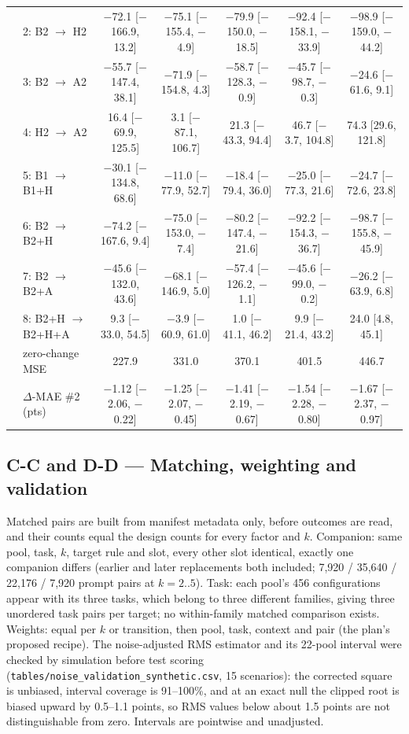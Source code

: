\documentclass{article}
\newcommand{\cto}{$\rightarrow$}
\begin{document}
\begin{table}[h]
{\begin{tabular}{llccccc}
 & 2: B2 \cto{} H2 & $-$72.1 [$-$166.9, 13.2] & $-$75.1 [$-$155.4, $-$4.9] & $-$79.9 [$-$150.0, $-$18.5] & $-$92.4 [$-$158.1, $-$33.9] & $-$98.9 [$-$159.0, $-$44.2] \\
 & 3: B2 \cto{} A2 & $-$55.7 [$-$147.4, 38.1] & $-$71.9 [$-$154.8, 4.3] & $-$58.7 [$-$128.3, $-$0.9] & $-$45.7 [$-$98.7, $-$0.3] & $-$24.6 [$-$61.6, 9.1] \\
 & 4: H2 \cto{} A2 & 16.4 [$-$69.9, 125.5] & 3.1 [$-$87.1, 106.7] & 21.3 [$-$43.3, 94.4] & 46.7 [$-$3.7, 104.8] & 74.3 [29.6, 121.8] \\
 & 5: B1 \cto{} B1+H & $-$30.1 [$-$134.8, 68.6] & $-$11.0 [$-$77.9, 52.7] & $-$18.4 [$-$79.4, 36.0] & $-$25.0 [$-$77.3, 21.6] & $-$24.7 [$-$72.6, 23.8] \\
 & 6: B2 \cto{} B2+H & $-$74.2 [$-$167.6, 9.4] & $-$75.0 [$-$153.0, $-$7.4] & $-$80.2 [$-$147.4, $-$21.6] & $-$92.2 [$-$154.3, $-$36.7] & $-$98.7 [$-$155.8, $-$45.9] \\
 & 7: B2 \cto{} B2+A & $-$45.6 [$-$132.0, 43.6] & $-$68.1 [$-$146.9, 5.0] & $-$57.4 [$-$126.2, $-$1.1] & $-$45.6 [$-$99.0, $-$0.2] & $-$26.2 [$-$63.9, 6.8] \\
 & 8: B2+H \cto{} B2+H+A & 9.3 [$-$33.0, 54.5] & $-$3.9 [$-$60.9, 61.0] & 1.0 [$-$41.1, 46.2] & 9.9 [$-$21.4, 43.2] & 24.0 [4.8, 45.1] \\
 & zero-change MSE & 227.9 & 331.0 & 370.1 & 401.5 & 446.7 \\
 & $\Delta$-MAE \#2 (pts) & $-$1.12 [$-$2.06, $-$0.22] & $-$1.25 [$-$2.07, $-$0.45] & $-$1.41 [$-$2.19, $-$0.67] & $-$1.54 [$-$2.28, $-$0.80] & $-$1.67 [$-$2.37, $-$0.97] \\
\bottomrule
\end{tabular}
}
\end{table}

\subsection*{C-C and D-D --- Matching, weighting and validation}
Matched pairs are built from manifest metadata only, before outcomes are read, and their counts equal the design counts for every factor and $k$. Companion: same pool, task, $k$, target rule and slot, every other slot identical, exactly one companion differs (earlier and later replacements both included; 7,920 / 35,640 / 22,176 / 7,920 prompt pairs at $k=2..5$). Task: each pool's 456 configurations appear with its three tasks, which belong to three different families, giving three unordered task pairs per target; no within-family matched comparison exists. Weights: equal per $k$ or transition, then pool, task, context and pair (the plan's proposed recipe). The noise-adjusted RMS estimator and its 22-pool interval were checked by simulation before test scoring (\texttt{tables/noise\_validation\_synthetic.csv}, 15 scenarios): the corrected square is unbiased, interval coverage is 91--100\%, and at an exact null the clipped root is biased upward by 0.5--1.1 points, so RMS values below about 1.5 points are not distinguishable from zero. Intervals are pointwise and unadjusted.
\end{document}
